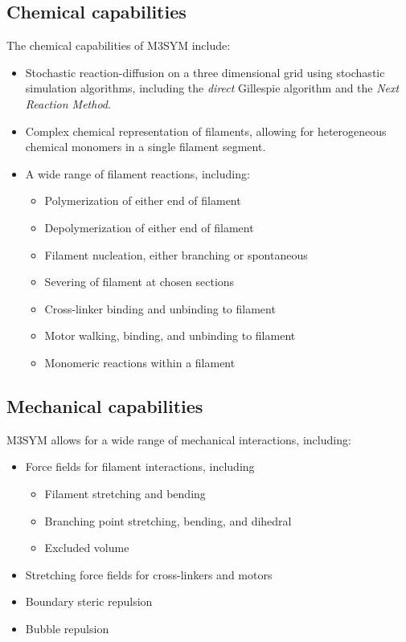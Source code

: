 \documentclass[11pt, oneside]{article}   	%
\begin{document}
\subsection{Chemical capabilities}
 The chemical capabilities of M3SYM include:

\begin{itemize}

\item Stochastic reaction-diffusion on a three dimensional grid using stochastic simulation algorithms, including the \textit{direct} Gillespie algorithm and the \textit{Next Reaction Method}.
\item Complex chemical representation of filaments, allowing for heterogeneous chemical monomers in a single filament segment.
\item A wide range of filament reactions, including:
\begin{itemize}
\item Polymerization of either end of filament
\item Depolymerization of either end of filament
\item Filament nucleation, either branching or spontaneous
\item Severing of filament at chosen sections
\item Cross-linker binding and unbinding to filament
\item Motor walking, binding, and unbinding to filament
\item Monomeric reactions within a filament

\end{itemize}
\end{itemize}

\subsection{Mechanical capabilities}
M3SYM allows for a wide range of mechanical interactions, including:

\begin{itemize}
\item Force fields for filament interactions, including
\begin{itemize}
\item Filament stretching and bending 
\item Branching point stretching, bending, and dihedral
\item Excluded volume 
\end{itemize}
\item Stretching force fields for cross-linkers and motors 
\item Boundary steric repulsion
\item Bubble repulsion
\end{itemize}
\end{document}
